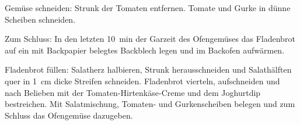 Gemüse schneiden: Strunk der Tomaten entfernen. 
Tomate und Gurke in dünne Scheiben schneiden.

Zum Schluss: In den letzten \SI{10}{min} der Garzeit des Ofengemüses das Fladenbrot auf ein mit Backpapier belegtes Backblech legen und im Backofen aufwärmen.

Fladenbrot füllen: Salatherz halbieren, Strunk herausschneiden und Salathälften quer in \SI{1}{cm} dicke Streifen schneiden. 
Fladenbrot vierteln, aufschneiden und nach Belieben mit der Tomaten-Hirtenkäse-Creme und dem Joghurtdip bestreichen. 
Mit Salatmischung, Tomaten- und Gurkenscheiben belegen und zum Schluss das Ofengemüse dazugeben. 
